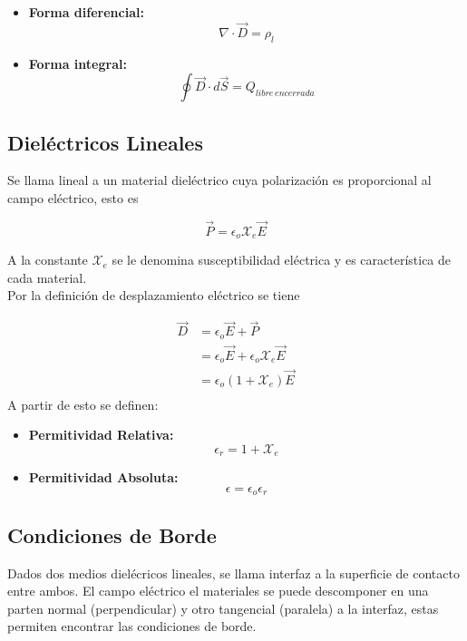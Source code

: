 \begin{itemize}
    \item \textbf{Forma diferencial:}
    \[\nabla\cdot\Vec{D}=\rho_l\]
    \item \textbf{Forma integral:}
    \[\oint\Vec{D}\cdot d\Vec{S}=Q_{libre\,encerrada}\]
\end{itemize}

\subsection{Dieléctricos Lineales}

Se llama lineal a un material dieléctrico cuya polarización es proporcional al campo eléctrico, esto es

\[\Vec{P}=\epsilon_o\mathcal{X}_e\Vec{E}\]

A la constante $\mathcal{X}_e$ se le denomina susceptibilidad eléctrica y es característica de cada material.\\

Por la definición de desplazamiento eléctrico se tiene

\begin{equation}
\begin{split}
    \Vec{D} &= \epsilon_o\Vec{E}+\Vec{P}\\
    &= \epsilon_o\Vec{E}+\epsilon_o\mathcal{X}_e\Vec{E}\\
    &= \epsilon_o(1+\mathcal{X}_e)\Vec{E}\\
\end{split}
\nonumber
\end{equation}
\bigbreak
A partir de esto se definen:

\begin{itemize}
    \item \textbf{Permitividad Relativa:}
    \[\epsilon_r=1+\mathcal{X}_e\]
    \item \textbf{Permitividad  Absoluta:}
    \[\epsilon = \epsilon_o\epsilon_r\]
\end{itemize}

\subsection{Condiciones de Borde}

Dados dos medios dielécricos lineales, se llama interfaz a la superficie de contacto entre ambos. El campo eléctrico el materiales se puede descomponer en una parten normal (perpendicular) y otro tangencial (paralela) a la interfaz, estas permiten encontrar las condiciones de borde.

